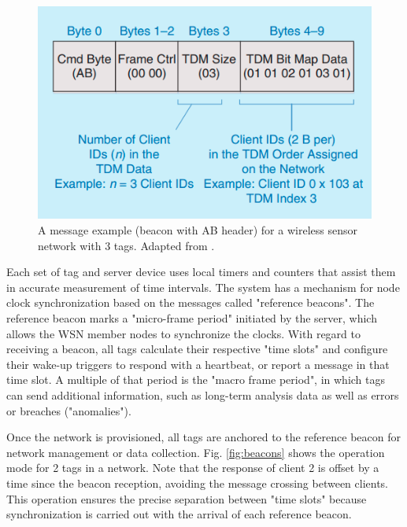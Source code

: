 \documentclass[journal]{IEEEtran}	%
\begin{document}
\begin{figure}[t!]
\centering
\includegraphics[width=0.9\columnwidth]{fig10.png}
\caption{A message example (beacon with AB header) for a wireless sensor network with 3 tags. Adapted from \cite{williams2017weaving}.}
\label{fig:beacon_example}
\end{figure}

Each set of tag and server device uses local timers and counters that assist them in accurate measurement of time intervals. The system has a mechanism for node clock synchronization based on the messages called "reference beacons". The reference beacon marks a "micro-frame period" initiated by the server, which allows the WSN member nodes to synchronize the clocks. With regard to receiving a beacon, all tags calculate their respective "time slots" and configure their wake-up triggers to respond with a heartbeat, or report a message in that time slot. A multiple of that period is the "macro frame period", in which tags can send additional information, such as long-term analysis data as well as errors or breaches ("anomalies").

Once the network is provisioned, all tags are anchored to the reference beacon for network management or data collection. Fig. \ref{fig:beacons} shows the operation mode for 2 tags in a network. Note that the response of client 2 is offset by a time since the beacon reception, avoiding the message crossing between clients. This operation ensures the precise separation between "time slots" because synchronization is carried out with the arrival of each reference beacon.
\end{document}
